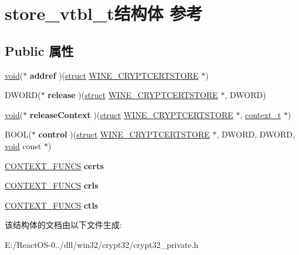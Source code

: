 \hypertarget{structstore__vtbl__t}{}\section{store\+\_\+vtbl\+\_\+t结构体 参考}
\label{structstore__vtbl__t}
\subsection*{Public 属性}
\begin{DoxyCompactItemize}
\item 
\mbox{\label{structstore__vtbl__t_a638858a33b5692dadce7f50d7c64a074}} 
\hyperlink{interfacevoid}{void}($\ast$ {\bfseries addref} )(\hyperlink{interfacestruct}{struct} \hyperlink{struct_w_i_n_e___c_r_y_p_t_c_e_r_t_s_t_o_r_e}{W\+I\+N\+E\+\_\+\+C\+R\+Y\+P\+T\+C\+E\+R\+T\+S\+T\+O\+RE} $\ast$)
\item 
\mbox{\label{structstore__vtbl__t_a26b053ca760d9a332be87bde4d9a4901}} 
D\+W\+O\+RD($\ast$ {\bfseries release} )(\hyperlink{interfacestruct}{struct} \hyperlink{struct_w_i_n_e___c_r_y_p_t_c_e_r_t_s_t_o_r_e}{W\+I\+N\+E\+\_\+\+C\+R\+Y\+P\+T\+C\+E\+R\+T\+S\+T\+O\+RE} $\ast$, D\+W\+O\+RD)
\item 
\mbox{\label{structstore__vtbl__t_a8e974f3655e46adb0e066e93ce7463a8}} 
\hyperlink{interfacevoid}{void}($\ast$ {\bfseries release\+Context} )(\hyperlink{interfacestruct}{struct} \hyperlink{struct_w_i_n_e___c_r_y_p_t_c_e_r_t_s_t_o_r_e}{W\+I\+N\+E\+\_\+\+C\+R\+Y\+P\+T\+C\+E\+R\+T\+S\+T\+O\+RE} $\ast$, \hyperlink{struct__context__t}{context\+\_\+t} $\ast$)
\item 
\mbox{\label{structstore__vtbl__t_acebafbcb76b14c52f6927b594e7ad30c}} 
B\+O\+OL($\ast$ {\bfseries control} )(\hyperlink{interfacestruct}{struct} \hyperlink{struct_w_i_n_e___c_r_y_p_t_c_e_r_t_s_t_o_r_e}{W\+I\+N\+E\+\_\+\+C\+R\+Y\+P\+T\+C\+E\+R\+T\+S\+T\+O\+RE} $\ast$, D\+W\+O\+RD, D\+W\+O\+RD, \hyperlink{interfacevoid}{void} const $\ast$)
\item 
\mbox{\label{structstore__vtbl__t_aa87d2bc79c24300db8a58a8d96c6115a}} 
\hyperlink{struct___c_o_n_t_e_x_t___f_u_n_c_s}{C\+O\+N\+T\+E\+X\+T\+\_\+\+F\+U\+N\+CS} {\bfseries certs}
\item 
\mbox{\label{structstore__vtbl__t_a9d10f2eec8b489db2e3bd3e558862546}} 
\hyperlink{struct___c_o_n_t_e_x_t___f_u_n_c_s}{C\+O\+N\+T\+E\+X\+T\+\_\+\+F\+U\+N\+CS} {\bfseries crls}
\item 
\mbox{\label{structstore__vtbl__t_a461cb3039a293db7298e8709f9857385}} 
\hyperlink{struct___c_o_n_t_e_x_t___f_u_n_c_s}{C\+O\+N\+T\+E\+X\+T\+\_\+\+F\+U\+N\+CS} {\bfseries ctls}
\end{DoxyCompactItemize}


该结构体的文档由以下文件生成\+:\begin{DoxyCompactItemize}
\item 
E\+:/\+React\+O\+S-\/0../dll/win32/crypt32/crypt32\+\_\+private.\+h\end{DoxyCompactItemize}
